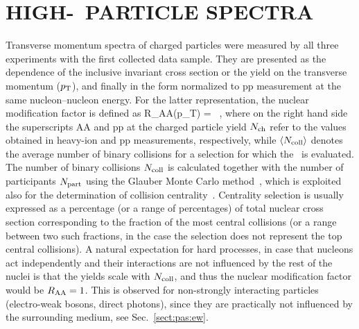 \section{HIGH-\pt\ PARTICLE SPECTRA}
\label{spectra}
Transverse momentum spectra of charged particles were measured by all three experiments with the first collected data sample. They are presented as the dependence of the inclusive invariant cross section or the yield on the transverse momentum ($p_{\rm T}$), and finally in the form normalized to pp measurement at the same nucleon--nucleon energy. For the latter representation, the nuclear modification factor is defined as
\be
R_{\rm AA}(p_{\rm T}) = \, ,
\label{eqks:RAA}
\ee
where on the right hand side the superscripts AA and pp at the charged particle yield $N_{\rm ch}$ refer to the values obtained in heavy-ion and pp measurements, respectively, while $\langle N_{\rm coll} \rangle$ denotes the average number of binary collisions for a selection for which the \Raa\ is evaluated. The number of binary collisions $N_{\rm coll}$ is calculated together with the number of participants $N_{\rm part}$ using the Glauber Monte Carlo method~\cite{Shor:1988vk,Alver:2008aq}, which is exploited also for the determination of collision centrality~\cite{Miller:2007ri,Abelev:2013qoq}. Centrality selection is usually expressed as a percentage (or a range of percentages) of total nuclear cross section corresponding to the fraction of the most central collisions (or a range between two such fractions, in the case the selection does not represent the top central collisions). A natural expectation for hard processes, in case that nucleons act independently and their interactions are not influenced by the rest of the nuclei is that the yields scale with $N_{\rm coll}$, and thus the nuclear modification factor would be $R_{\rm AA} = 1$. This is observed for non-strongly interacting particles (electro-weak bosons, direct photons), since they are practically not influenced by the surrounding medium, see Sec.~\ref{sect:pas:ew}.
